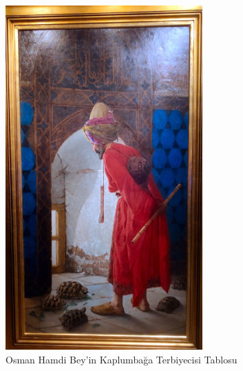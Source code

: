\begin{figure}[H]
    \centering
    \includegraphics[height=0.95\textheight]{assets/kaplumbaga_terbiyecisi.jpg}
    \caption{Osman Hamdi Bey'in Kaplumbağa Terbiyecisi Tablosu}
\end{figure}